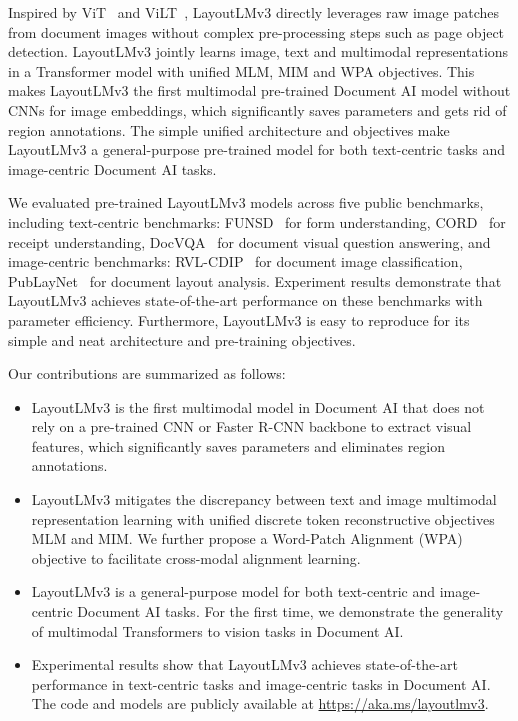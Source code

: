 \documentclass[sigconf]{acmart}
\begin{document}
Inspired by ViT~\cite{dosovitskiy2020vit} and ViLT~\cite{kim2021vilt}, LayoutLMv3 directly leverages raw image patches from document images without complex pre-processing steps such as page object detection.
LayoutLMv3 jointly learns image, text and multimodal representations in a Transformer model with unified MLM, MIM and WPA objectives.
This makes LayoutLMv3 the first multimodal pre-trained Document AI model without CNNs for image embeddings, which significantly saves parameters and gets rid of region annotations.
The simple unified architecture and objectives make LayoutLMv3 a general-purpose pre-trained model for both text-centric tasks and image-centric Document AI tasks.


We evaluated pre-trained LayoutLMv3 models across five public benchmarks, including text-centric benchmarks: FUNSD~\cite{jaume2019funsd} for form understanding, CORD~\cite{park2019cord} for receipt understanding, DocVQA~\cite{mathew2021docvqa} for document visual question answering, and image-centric benchmarks: RVL-CDIP~\cite{harley2015icdar} for document image classification, PubLayNet~\cite{zhong2019publaynet} for document layout analysis. 
Experiment results demonstrate that LayoutLMv3 achieves state-of-the-art performance on these benchmarks with parameter efficiency. 
Furthermore, LayoutLMv3 is easy to reproduce for its simple and neat architecture and pre-training objectives.


Our contributions are summarized as follows:
\begin{itemize}
	\item LayoutLMv3 is the first multimodal model in Document AI that does not rely on a pre-trained CNN or Faster R-CNN backbone to extract visual features, which significantly saves parameters and eliminates region annotations.
	\item LayoutLMv3 mitigates the discrepancy between text and image multimodal representation learning with unified discrete token reconstructive objectives MLM and MIM. We further propose a Word-Patch Alignment (WPA) objective to facilitate cross-modal alignment learning.
	\item LayoutLMv3 is a general-purpose model for both text-centric and image-centric Document AI tasks. For the first time, we demonstrate the generality of multimodal Transformers to vision tasks in Document AI.
	\item Experimental results show that LayoutLMv3 achieves state-of-the-art performance in text-centric tasks and image-centric tasks in Document AI. The code and models are publicly available at \url{https://aka.ms/layoutlmv3}.
\end{itemize}
\end{document}
